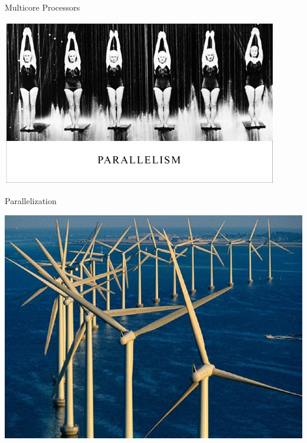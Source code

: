 \documentclass[xcolor=dvipsnames,9pt,mathserif]{beamer}
\begin{document}
\begin{frame}[t]{Multicore Processors}
  \begin{center}
    \bfseries
    \begin{minipage}[b]{4.3cm}
      \centering
      \includegraphics[width=\textwidth]{parallelism.jpg}

      Parallelization
    \end{minipage}
    \hfill
    \begin{minipage}[b]{3.5cm}
      \centering
      \includegraphics[width=\textwidth]{power.jpg}


\end{minipage}
\end{center}
\end{frame}
\end{document}
